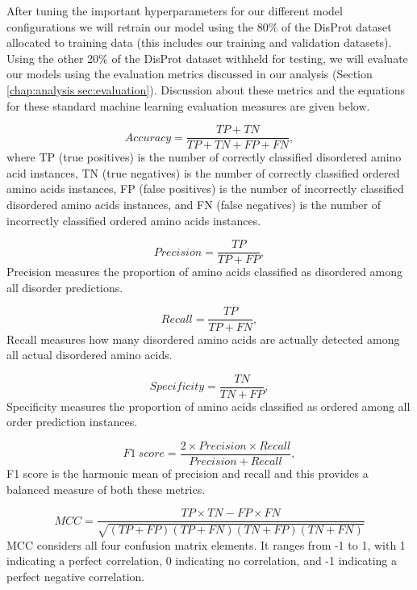 \documentclass{l4proj}
\begin{document}
After tuning the important hyperparameters for our different model configurations we will retrain our model using the 80\% of the DisProt dataset allocated to training data (this includes our training and validation datasets). Using the other 20\% of the DisProt dataset withheld for testing, we will evaluate our models using the evaluation metrics discussed in our analysis (Section \ref{chap:analysis sec:evaluation}). Discussion about these metrics and the equations for these standard machine learning evaluation measures are given below. 

\begin{equation*}
Accuracy = \frac{TP + TN}{TP + TN + FP + FN} ,
\end{equation*}
where TP (true positives) is the number of correctly classified disordered amino acid instances, TN (true negatives) is the number of correctly classified ordered amino acids instances, FP (false positives) is the number of incorrectly classified disordered amino acids instances, and FN (false negatives) is the number of incorrectly classified ordered amino acids instances.

\begin{equation*}
Precision = \frac{TP}{TP + FP} ,
\end{equation*}
Precision measures the proportion of amino acids classified as disordered among all disorder predictions.

\begin{equation*}
Recall = \frac{TP}{TP + FN} ,
\end{equation*}
Recall measures how many disordered amino acids are actually detected among all actual disordered amino acids.

\begin{equation*}
Specificity = \frac{TN}{TN + FP} ,
\end{equation*}
Specificity measures the proportion of amino acids classified as ordered among all order prediction instances.

\begin{equation*}
F1\ score = \frac{2 \times Precision \times Recall}{Precision + Recall} ,
\end{equation*}
F1 score is the harmonic mean of precision and recall and this provides a balanced measure of both these metrics.

\begin{equation*}
MCC = \frac{TP \times TN - FP \times FN}{\sqrt{(TP + FP)(TP + FN)(TN + FP)(TN + FN)}}
\end{equation*}
MCC considers all four confusion matrix elements. It ranges from -1 to 1, with 1 indicating a perfect correlation, 0 indicating no correlation, and -1 indicating a perfect negative correlation.
\end{document}

